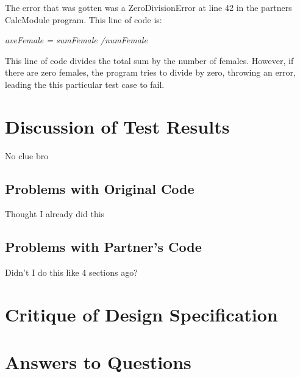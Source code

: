 \documentclass[12pt]{article}
\begin{document}
The error that was gotten was a ZeroDivisionError at line 42 in the partners
CalcModule program. This line of code is:

\centerline{\textit{aveFemale = sumFemale /numFemale}}

This line of code divides the total sum by the number of females. However, if there
are zero females, the program tries to divide by zero, throwing an error, leading
the this particular test case to fail.


\section{Discussion of Test Results}

No clue bro

\subsection{Problems with Original Code}

Thought I already did this

\subsection{Problems with Partner's Code}

Didn't I do this like 4 sections ago?

\section{Critique of Design Specification}



\section{Answers to Questions}

\end{document}
